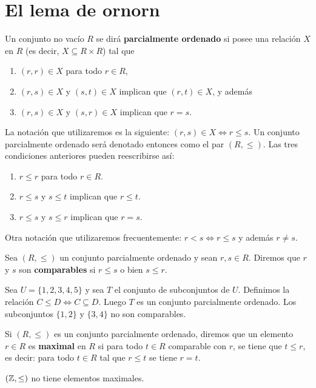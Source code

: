 \chapter{El lema de ornorn}

Un conjunto no vacío $R$ se dirá \textbf{parcialmente ordenado} si posee una relación $X$ en $R$ (es decir, $X\subseteq R\times R$)
tal que 
\begin{enumerate}   	
\item $(r,r)\in X$ para todo $r\in R$,
\item $(r,s)\in X$ y $(s,t)\in X$ implican que $(r,t)\in X$, y además
\item $(r,s)\in X$ y $(s,r)\in X$ implican que $r=s$.
\end{enumerate}

La notación que utilizaremos es la siguiente: $(r,s)\in X\Longleftrightarrow r\leq s$. Un conjunto parcialmente ordenado será denotado entonces como el par $(R,\leq)$. Las 
tres condiciones anteriores pueden reescribirse así:
\begin{enumerate}
\item $r\leq r$ para todo $r\in R$.
\item $r\leq s$ y $s\leq t$ implican que $r\leq t$.
\item $r\leq s$ y $s\leq r$ implican que $r=s$.
\end{enumerate}

Otra notación que utilizaremos frecuentemente: $r<s\Longleftrightarrow r\leq s$ y además $r\ne s$.

Sea $(R,\leq)$ un conjunto parcialmente ordenado y sean $r,s\in R$. Diremos que $r$ y $s$ son \textbf{comparables}
si $r\leq s$ o bien $s\leq r$. 	

\begin{example}
Sea $U=\{1,2,3,4,5\}$ y sea $T$ el conjunto de subconjuntos de $U$. Definimos 
la relación $C\leq D\Longleftrightarrow C\subseteq D$. Luego $T$ es un conjunto parcialmente ordenado. Los
subconjuntos $\{1,2\}$ y $\{3,4\}$ no son comparables. 
\end{example}

Si $(R,\leq)$ es un conjunto parcialmente ordenado, diremos que un elemento $r\in R$ es \textbf{maximal} en $R$ 
si para todo $t\in R$ comparable con $r$, se tiene que $t\leq r$, es decir: para todo $t\in R$ tal que $r\leq t$ se tiene $r=t$. 	

\begin{example}
$(\mathbb{Z},\leq)$ no tiene elementos maximales.
\end{example}

